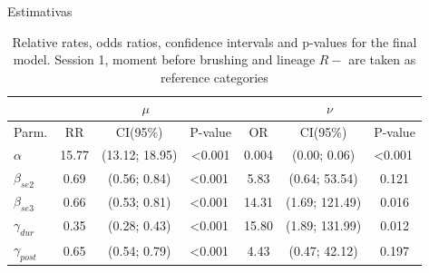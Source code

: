 \documentclass[
  ignorenonframetext,
  serif,
  professionalfont,
  usenames,
  dvipsnames,
  aspectratio = 169]{beamer}
\begin{document}
\begin{frame}{Estimativas}
\protect\hypertarget{estimativas}{}
\begin{table}[h]
    \centering
    \caption{Relative rates, odds ratios, confidence intervals and p-values for the final  model. Session 1, moment before brushing and lineage $R-$ are taken as reference categories}
    \begin{tabular}{lcclccc}
        \hline
        & \multicolumn{3}{c}{$\mu$}                                                                                                         & \multicolumn{3}{c}{$\nu$}                                                                                                        \\ \hline
        \multicolumn{1}{l|}{Parm.}           & RR                    & CI(95\%)                             & \multicolumn{1}{c|}{P-value}                                & OR                    & CI(95\%)                             & P-value                                                    \\ \hline
        \multicolumn{1}{l|}{$\alpha$}        & {\color[HTML]{000000} 15.77} & {\color[HTML]{000000} (13.12; 18.95)} & \multicolumn{1}{c|}{{\color[HTML]{000000} \textless{}0.001}} & {\color[HTML]{000000} 0.004} & {\color[HTML]{000000} (0.00; 0.06)}   & \multicolumn{1}{l}{{\color[HTML]{000000} \textless{}0.001}} \\
        \multicolumn{1}{l|}{$\beta_{se2}$}   & {\color[HTML]{000000} 0.69}  & {\color[HTML]{000000} (0.56; 0.84)}   & \multicolumn{1}{l|}{{\color[HTML]{000000} \textless{}0.001}} & {\color[HTML]{000000} 5.83}  & {\color[HTML]{000000} (0.64; 53.54)}  & {\color[HTML]{000000} 0.121}                                \\
        \multicolumn{1}{l|}{$\beta_{se3}$}   & {\color[HTML]{000000} 0.66}  & {\color[HTML]{000000} (0.53; 0.81)}   & \multicolumn{1}{l|}{{\color[HTML]{000000} \textless{}0.001}} & {\color[HTML]{000000} 14.31} & {\color[HTML]{000000} (1.69; 121.49)} & \multicolumn{1}{l}{{\color[HTML]{000000}\   0.016}} \\
        \multicolumn{1}{l|}{$\gamma_{dur}$}  & {\color[HTML]{000000} 0.35}  & {\color[HTML]{000000} (0.28; 0.43)}   & \multicolumn{1}{l|}{{\color[HTML]{000000} \textless{}0.001}} & {\color[HTML]{000000} 15.80} & {\color[HTML]{000000} (1.89; 131.99)} & \multicolumn{1}{l}{{\color[HTML]{000000} \ 0.012}} \\
        \multicolumn{1}{l|}{$\gamma_{post}$} & {\color[HTML]{000000} 0.65}  & {\color[HTML]{000000} (0.54; 0.79)}   & \multicolumn{1}{l|}{{\color[HTML]{000000} \textless{}0.001}} & {\color[HTML]{000000} 4.43}  & {\color[HTML]{000000} (0.47; 42.12)}  & {\color[HTML]{000000} 0.197}                                \\

\end{tabular}
\end{table}
\end{frame}
\end{document}
